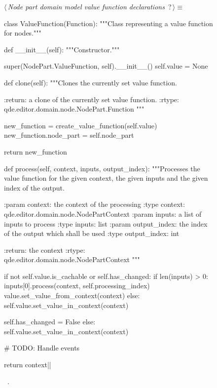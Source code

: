\documentclass[%
    a4paper,    %
    justified,  %
    nobib,      %
    openany     %
]{tufte-book}
\begin{document}
\begin{figure}
\begin{flushleft} \small
\begin{minipage}{\linewidth}\label{scrap113}\raggedright\small
{} $\langle\,${\itshape Node part domain model value function declarations}\nobreak\ {\footnotesize {?}}$\,\rangle\equiv$
\vspace{-1ex}
\begin{pythoncode}
class ValueFunction(Function):
    """Class representing a value function for nodes."""

    def __init__(self):
        """Constructor."""

        super(NodePart.ValueFunction, self).__init__()
        self.value = None

    def clone(self):
        """Clones the currently set value function.

        :return: a clone of the currently set value function.
        :rtype: qde.editor.domain.node.NodePart.Function
        """

        new_function = create_value_function(self.value)
        new_function.node_part = self.node_part

        return new_function

    def process(self, context, inputs, output_index):
        """Processes the value function for the given context, the given inputs
        and the given index of the output.

        :param context: the context of the processing
        :type  context: qde.editor.domain.node.NodePartContext
        :param inputs: a list of inputs to process
        :type inputs: list
        :param output_index: the index of the output which shall be used
        :type output_index: int

        :return: the context
        :rtype:  qde.editor.domain.node.NodePartContext
        """

        if not self.value.is_cachable or self.has_changed:
            if len(inputs) > 0:
                inputs[0].process(context, self.processing_index)
                value.set_value_from_context(context)
            else:
                self.value.set_value_in_context(context)

            self.has_changed = False
        else:
            self.value.set_value_in_context(context)

        # TODO: Handle events

        return context|\NWsep|
\end{pythoncode}
\vspace{1.5ex}
\footnotesize
\begin{list}{}{\setlength{\itemsep}{-\parsep}\setlength{\itemindent}{-\leftmargin}}
\item \NWtxtMacroRefIn\ .


\end{list}
\end{minipage}
\end{flushleft}
\end{figure}
\end{document}

